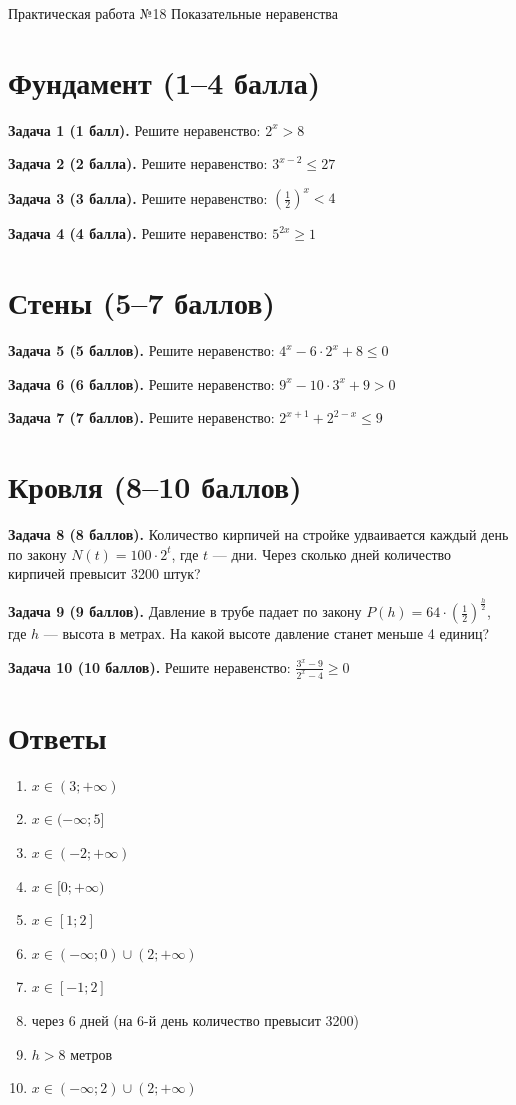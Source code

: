 \documentclass{umk-matematika}
\begin{document}
\maketitlepage
    {Практическая работа №18}
    {Показательные неравенства}
    {}

\section{Фундамент (1--4 балла)}

\textbf{Задача 1 (1 балл).} Решите неравенство: $2^x > 8$

\textbf{Задача 2 (2 балла).} Решите неравенство: $3^{x-2} \le 27$

\textbf{Задача 3 (3 балла).} Решите неравенство: $\left(\frac{1}{2}\right)^x < 4$

\textbf{Задача 4 (4 балла).} Решите неравенство: $5^{2x} \ge 1$

\section{Стены (5--7 баллов)}

\textbf{Задача 5 (5 баллов).} Решите неравенство: $4^{x} - 6 \cdot 2^{x} + 8 \le 0$

\textbf{Задача 6 (6 баллов).} Решите неравенство: $9^{x} - 10 \cdot 3^{x} + 9 > 0$

\textbf{Задача 7 (7 баллов).} Решите неравенство: $2^{x+1} + 2^{2-x} \le 9$

\section{Кровля (8--10 баллов)}

\textbf{Задача 8 (8 баллов).} Количество кирпичей на стройке удваивается каждый день по закону $N(t) = 100 \cdot 2^{t}$, где $t$ — дни. Через сколько дней количество кирпичей превысит 3200 штук?

\textbf{Задача 9 (9 баллов).} Давление в трубе падает по закону $P(h) = 64 \cdot \left(\frac{1}{2}\right)^{\frac{h}{2}}$, где $h$ — высота в метрах. На какой высоте давление станет меньше 4 единиц?

\textbf{Задача 10 (10 баллов).} Решите неравенство: $\frac{3^{x} - 9}{2^{x} - 4} \ge 0$

\newpage
\section*{Ответы}

\begin{enumerate}
  \item $x \in (3; +\infty)$
  \item $x \in (-\infty; 5]$
  \item $x \in (-2; +\infty)$
  \item $x \in [0; +\infty)$
  \item $x \in [1; 2]$
  \item $x \in (-\infty; 0) \cup (2; +\infty)$
  \item $x \in [-1; 2]$
  \item через $6$ дней (на 6-й день количество превысит 3200)
  \item $h > 8$ метров
  \item $x \in (-\infty; 2) \cup (2; +\infty)$
\end{enumerate}
\end{document}
